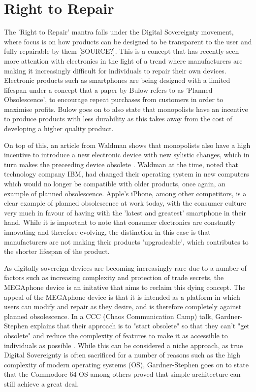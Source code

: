 

\section{Right to Repair}

The 'Right to Repair' mantra falls under the Digital Sovereignty movement, where focus is on how products can be designed to be transparent to the user and fully repairable by them [SOURCE?].
This is a concept that has recently seen more attention with electronics in the light of a trend where manufacturers are making it increasingly difficult for individuals to repair their own devices.
Electronic products such as smartphones are being designed with a limited lifespan under a concept that a paper by Bulow \cite{obsolescence} refers to as 'Planned Obsolescence', to encourage repeat purchases from customers in order to maximise profits.
Bulow goes on to also state that monopolists have an incentive to produce products with less durability as this takes away from the cost of developing a higher quality product.

On top of this, an article from Waldman shows that monopolists also have a high incentive to introduce a new electronic device with new sylistic changes, which in turn makes the preceeding device obsolete \cite{obsolescence2}.
Waldman at the time, noted that technology company IBM, had changed their operating system in new computers which would no longer be compatible with older products, once again, an example of planned obsolescence.
Apple's iPhone, among other competitors, is a clear example of planned obsolescence at work today, with the consumer culture very much in favour of having with the 'latest and greatest' smartphone in their hand.
While it is important to note that consumer electronics are constantly innovating and therefore evolving, the distinction in this case is that manufacturers are not making their products 'upgradeable', which contributes to the shorter lifespan of the product.

As digitally sovereign devices are becoming increasingly rare due to a number of factors such as increasing complexity and protection of trade secrets, the MEGAphone device is an initative that aims to reclaim this dying concept. %
The appeal of the MEGAphone device is that it is intended as a platform in which users can modify and repair as they desire, and is therefore completely against planned obsolescence.
In a CCC (Chaos Communication Camp) talk, Gardner-Stephen explains that their approach is to "start obsolete" so that they can't "get obsolete" and reduce the complexity of features to make it as accessible to individuals as possible \cite{mobilehistory}.
While this can be considered a niche approach, as true Digital Sovereignty is often sacrificed for a number of reasons such as the high complexity of modern operating systems (OS), Gardner-Stephen goes on to state that the Commodore 64 OS among others proved that simple architecture can still achieve a great deal.

